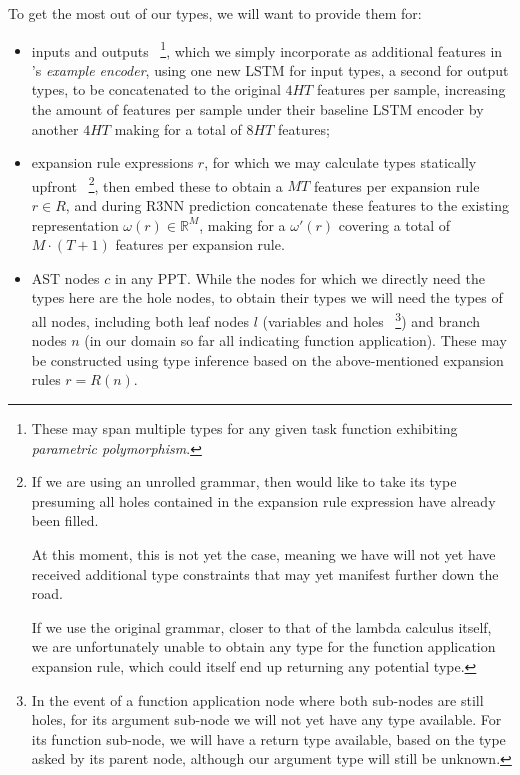 \documentclass{article}
\begin{document}
To get the most out of our types, we will want to provide them for:
\begin{itemize}
    \item inputs and outputs%
    ~\footnote{
        These may span multiple types for any given task function exhibiting \emph{parametric polymorphism}.
    },
    which we simply incorporate as additional features in \citet{nsps}'s \emph{example encoder},
    using one new LSTM for input types, a second for output types,
    to be concatenated to the original $4HT$ features per sample,
    increasing the amount of features per sample under their baseline
    LSTM encoder by another $4HT$ making for a total of $8HT$ features;

    \item expansion rule expressions $r$, for which we may calculate types statically upfront%
    ~\footnote{
        If we are using an unrolled grammar,
        then would like to take its type presuming all holes contained
        in the expansion rule expression have already been filled.

        At this moment, this is not yet the case,
        meaning we have will not yet have received additional type
        constraints that may yet manifest further down the road.

        If we use the original grammar,
        closer to that of the lambda calculus itself,
        we are unfortunately unable to obtain any type for the function application expansion rule,
        which could itself end up returning any potential type.
    },
    then embed these to obtain a $MT$ features per expansion rule $r \in R$,
    and during R3NN prediction concatenate these features to the existing
    representation $\omega(r) \in \mathbb{R}^M$,
    making for a $\omega'(r)$ covering a total of $M \cdot (T+1)$ features per expansion rule.

    \item AST nodes $c$ in any PPT.
    While the nodes for which we directly need the types here are the hole nodes,
    to obtain their types we will need the types of all nodes,
    including both leaf nodes $l$ (variables and holes%
    ~\footnote{
        In the event of a function application node where both sub-nodes are still holes,
        for its argument sub-node we will not yet have any type available.
        For its function sub-node, we will have a return type available,
        based on the type asked by its parent node,
        although our argument type will still be unknown.
    })
    and branch nodes $n$ (in our domain so far all indicating function application).
    These may be constructed using type inference based on the above-mentioned expansion rules $r=R(n)$.


\end{itemize}
\end{document}
